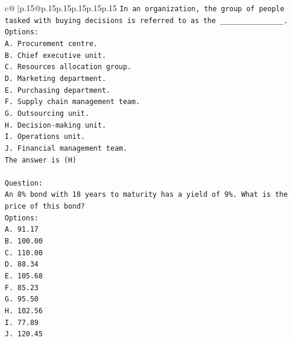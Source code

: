 \documentclass{article}
\begin{document}
{\begin{supertabular}{c@{$\;$}|p{.15\linewidth}@{}p{.15\linewidth}p{.15\linewidth}p{.15\linewidth}p{.15\linewidth}p{.15\linewidth}}
{{{\texttt{In an organization, the group of people tasked with buying decisions is referred to as the \_\_\_\_\_\_\_\_\_\_\_\_\_\_\_.} \\
\texttt{Options:} \\
\texttt{A. Procurement centre.} \\
\texttt{B. Chief executive unit.} \\
\texttt{C. Resources allocation group.} \\
\texttt{D. Marketing department.} \\
\texttt{E. Purchasing department.} \\
\texttt{F. Supply chain management team.} \\
\texttt{G. Outsourcing unit.} \\
\texttt{H. Decision{-}making unit.} \\
\texttt{I. Operations unit.} \\
\texttt{J. Financial management team.} \\
\texttt{The answer is (H)} \\
\\ 
\texttt{Question:} \\
\texttt{An 8\% bond with 18 years to maturity has a yield of 9\%. What is the price of this bond?} \\
\texttt{Options:} \\
\texttt{A. 91.17} \\
\texttt{B. 100.00} \\
\texttt{C. 110.00} \\
\texttt{D. 88.34} \\
\texttt{E. 105.68} \\
\texttt{F. 85.23} \\
\texttt{G. 95.50} \\
\texttt{H. 102.56} \\
\texttt{I. 77.89} \\
\texttt{J. 120.45} \\
            }
        }
    }
     \\ \\


\end{supertabular}}
\end{document}
